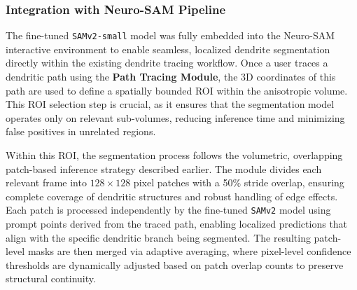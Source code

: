 






\subsubsection{\textbf{Integration with Neuro-\gls{SAM} Pipeline}}

The fine-tuned \texttt{\gls{SAMv2}-small} model was fully embedded into the Neuro-\gls{SAM} interactive environment to enable seamless, localized dendrite segmentation directly within the existing dendrite tracing workflow. Once a user traces a dendritic path using the \textbf{Path Tracing Module}, the 3D coordinates of this path are used to define a spatially bounded \gls{ROI} within the anisotropic volume. This \gls{ROI} selection step is crucial, as it ensures that the segmentation model operates only on relevant sub-volumes, reducing inference time and minimizing false positives in unrelated regions.

Within this \gls{ROI}, the segmentation process follows the volumetric, overlapping patch-based inference strategy described earlier. The module divides each relevant frame into $128 \times 128$ pixel patches with a 50\% stride overlap, ensuring complete coverage of dendritic structures and robust handling of edge effects. Each patch is processed independently by the fine-tuned \texttt{\gls{SAMv2}} model using prompt points derived from the traced path, enabling localized predictions that align with the specific dendritic branch being segmented. The resulting patch-level masks are then merged via adaptive averaging, where pixel-level confidence thresholds are dynamically adjusted based on patch overlap counts to preserve structural continuity.

